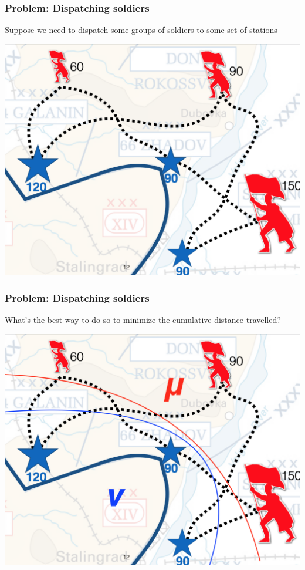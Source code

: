 \documentclass[mathserif,compress,xcolor={dvipsnames}]{beamer}
\renewcommand\;{\,}
\begin{document}
\begin{frame}\frametitle{Problem: Dispatching soldiers}
Suppose we need to dispatch some groups of soldiers to some set of stations 
\begin{center}
\includegraphics[width=0.8\linewidth]{Figures/soldiers.png}
\end{center}
\end{frame}

\begin{frame}\frametitle{Problem: Dispatching soldiers}
What's the best way to do so to minimize the cumulative distance travelled? 
\begin{center}
\includegraphics[width=0.8\linewidth]{Figures/soldiers_measures.png}
\end{center}
\end{frame}
\end{document}
